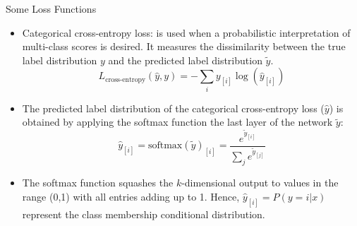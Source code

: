 \documentclass[handout]{beamer}
\begin{document}
\begin{frame}{Some Loss Functions}
\begin{scriptsize}
\begin{itemize}

 \item Categorical cross-entropy loss:  is used when a probabilistic interpretation of multi-class scores is desired. It measures the dissimilarity between the true label distribution $y$ and the predicted label distribution $\tilde{y}$. 
   \begin{displaymath}
  L_{\text{cross-entropy}}(\hat{y},y) = - \sum_{i} y_{[i]} \log(\hat{y}_{[i]})   
 \end{displaymath}
\item The predicted label distribution of the categorical cross-entropy loss ($\hat{y}$) is obtained by applying the softmax function the last layer of the network $\tilde{y}$:
    \begin{displaymath}
\hat{y}_{[i]} = \text{softmax}(\tilde{y})_{[i]} =  \frac{e^{\tilde{y}_{[i]}}}{\sum_{j}e^{\tilde{y}_{[j]}}}   
 \end{displaymath}
 
\item The softmax function squashes the $k$-dimensional output to values in the range (0,1) with all entries adding up to 1. Hence, $\hat{y}_{[i]} = P( y = i |x)$ represent the class membership conditional distribution.
 
\end{itemize}
\end{scriptsize}


\end{frame}
\end{document}

